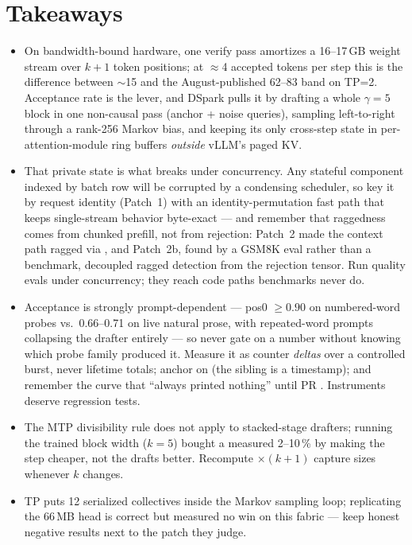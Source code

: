 \FloatBarrier
\section*{Takeaways}

\begin{itemize}
  \item On bandwidth-bound hardware, one verify pass amortizes a
    16--17\,GB weight stream over $k{+}1$ token positions; at
    $\approx$4 accepted tokens per step this is the difference between
    $\sim$15 and the August-published 62--83 \tokspersec{} band on TP=2.
    Acceptance rate is the lever,
    and DSpark pulls it by drafting a whole $\gamma{=}5$ block in one
    non-causal pass (anchor + noise queries), sampling left-to-right through
    a rank-256 Markov bias, and keeping its only cross-step state in
    per-attention-module ring buffers \emph{outside} vLLM's paged KV.
  \item That private state is what breaks under concurrency. Any stateful
    component indexed by batch row will be corrupted by a condensing
    scheduler, so key it by request identity (Patch~1) with an
    identity-permutation fast path that keeps single-stream behavior
    byte-exact --- and remember that raggedness comes from chunked prefill,
    not from rejection: Patch~2 made the context path ragged via
    , and Patch~2b, found by a GSM8K eval rather than a
    benchmark, decoupled ragged detection from the rejection tensor. Run
    quality evals under concurrency; they reach code paths benchmarks never
    do.
  \item Acceptance is strongly prompt-dependent --- pos0 $\ge 0.90$ on
    numbered-word probes vs.\ 0.66--0.71 on live natural prose, with
    repeated-word prompts collapsing the drafter entirely --- so never gate
    on a number without knowing which probe family produced it. Measure it as
    counter \emph{deltas} over a controlled burst, never lifetime totals;
    anchor on  (the  sibling is a timestamp); and
    remember the curve that ``always printed nothing'' until PR .
    Instruments deserve regression tests.
  \item The MTP divisibility rule does not apply to stacked-stage drafters;
    running the trained block width ($k{=}5$) bought a measured 2--10\,\% by
    making the step cheaper, not the drafts better. Recompute
     $\times (k{+}1)$ capture sizes whenever $k$ changes.
  \item TP puts 12 serialized collectives inside the Markov sampling loop;
    replicating the 66\,MB head is correct but measured no win on this
    fabric --- keep honest negative results next to the patch they judge.
\end{itemize}

